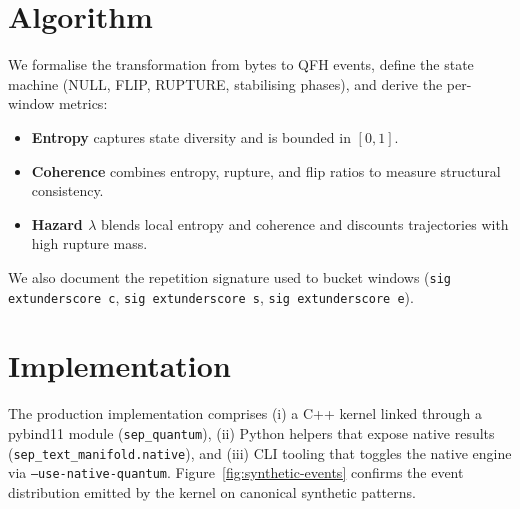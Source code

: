 \documentclass[11pt]{article}
\begin{document}
\section{Algorithm}
We formalise the transformation from bytes to QFH events, define the state machine (NULL, FLIP, RUPTURE, stabilising phases), and derive the per-window metrics:
\begin{itemize}
  \item \textbf{Entropy} captures state diversity and is bounded in $[0,1]$.
  \item \textbf{Coherence} combines entropy, rupture, and flip ratios to measure structural consistency.
  \item \textbf{Hazard $\lambda$} blends local entropy and coherence and discounts trajectories with high rupture mass.
\end{itemize}
We also document the repetition signature used to bucket windows (\texttt{sig	extunderscore c}, \texttt{sig	extunderscore s}, \texttt{sig	extunderscore e}).

\section{Implementation}
The production implementation comprises (i) a C++ kernel linked through a pybind11 module (\texttt{sep\_quantum}), (ii) Python helpers that expose native results (\texttt{sep\_text\_manifold.native}), and (iii) CLI tooling that toggles the native engine via \texttt{--use-native-quantum}. Figure~\ref{fig:synthetic-events} confirms the event distribution emitted by the kernel on canonical synthetic patterns.
\end{document}
